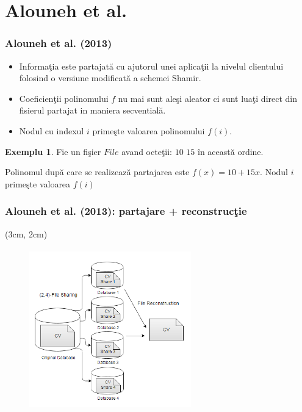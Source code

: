 \documentclass{beamer}
\theoremstyle{definition}
\newtheorem{my_example}[theorem]{Exemplu}
\begin{document}
\section{Alouneh et al.}
\begin{frame}
    \frametitle{Alouneh et al. (2013)}
    \begin{itemize}
        \item Informa\c{t}ia este partajat\u{a} cu ajutorul unei aplica\c{t}ii la nivelul clientului folosind o versiune modificat\u{a} a schemei Shamir.
        \pause
        \item Coeficien\c{t}ii polinomului $f$ nu mai sunt ale\c{s}i aleator ci sunt lua\c{t}i direct din fisierul partajat in maniera secvential\u{a}.
        \pause
        \item Nodul cu indexul $i$ prime\c{s}te valoarea polinomului $f(i)$.
    \end{itemize} 
    \pause
    \begin{my_example}
        Fie un fi\c{s}ier $File$ avand octe\c{t}ii: $10$ $15$ \^{i}n aceast\u{a} ordine.

        Polinomul dup\u{a} care se realizeaz\u{a} partajarea este $f(x) = 10 + 15x$.
        Nodul $i$ prime\c{s}te valoarea $f(i)$
    \end{my_example}
\end{frame}
\begin{frame}
    \frametitle{Alouneh et al. (2013): partajare + reconstruc\c{t}ie}
     \begin{textblock*}{4cm}(3cm, 2cm)
        \begin{figure}
            \includegraphics[width=7cm,height=7cm,keepaspectratio]{img/results/sharing.png}
       \end{figure}
    \end{textblock*}
\end{frame}
\end{document}
